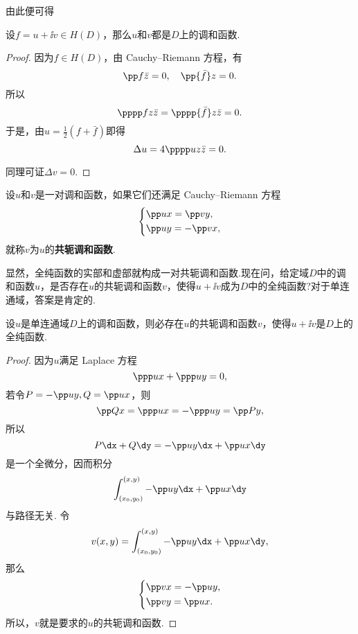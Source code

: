 由此便可得
\begin{theorem}\label{thm2.2.9}
  设$f=u+\ii v\in H(D)$，那么$u$和$v$都是$D$上的调和函数.
\end{theorem}
\begin{proof}
  因为$f\in H(D)$，由 Cauchy--Riemann 方程，有
  \[
    \pp f{\bar z} = 0,\quad \pp{\bar f}z = 0.
  \]
  所以
  \[
    \pppp fz{\bar z} = \pppp{\bar f}z{\bar z} = 0.
  \]
  于是，由$u=\frac12(f+\bar f)$即得
  \[
    \Delta u = 4\pppp uz{\bar z} = 0.
  \]

  同理可证$\Delta v=0$.
\end{proof}
\begin{definition}\label{def2.2.10}
  设$u$和$v$是一对调和函数，如果它们还满足 Cauchy--Riemann 方程
  \[
    \left\{\begin{aligned}
           & \pp ux = \pp vy,\\
           & \pp uy = -\pp vx,
          \end{aligned}\right.
  \]
  就称$v$为$u$的\textbf{共轭调和函数}.
\end{definition}

显然，全纯函数的实部和虚部就构成一对共轭调和函数.现在问，给定域$D$中的调和函数$u$，是否存在$u$的共轭调和函数$v$，使得$u+\ii v$成为$D$中的全纯函数?对于单连通域，答案是肯定的.
\begin{theorem}
  设$u$是单连通域$D$上的调和函数，则必存在$u$的共轭调和函数$v$，使得$u+\ii v$是$D$上的全纯函数.
\end{theorem}
\begin{proof}
  因为$u$满足 Laplace 方程
  \[
    \ppp ux + \ppp uy = 0,
  \]
  若令$P=-\pp uy,Q=\pp ux$，则
  \[
    \pp Qx = \ppp ux = -\ppp uy = \pp Py,
  \]
  所以
  \[
    P\dx + Q\dy = -\pp uy\dx + \pp ux\dy
  \]
  是一个全微分，因而积分
  \[
    \int_{(x_0,y_0)}^{(x,y)} - \pp uy\dx + \pp ux\dy
  \]
  与路径无关. 令
  \[
    v(x,y) = \int_{(x_0,y_0)}^{(x,y)} - \pp uy\dx+\pp ux\dy,
  \]
  那么
  \[
    \left\{\begin{aligned}
          & \pp vx = -\pp uy,\\
          & \pp vy = \pp ux.
           \end{aligned}
    \right.
  \]
  所以，$v$就是要求的$u$的共轭调和函数.
\end{proof}

